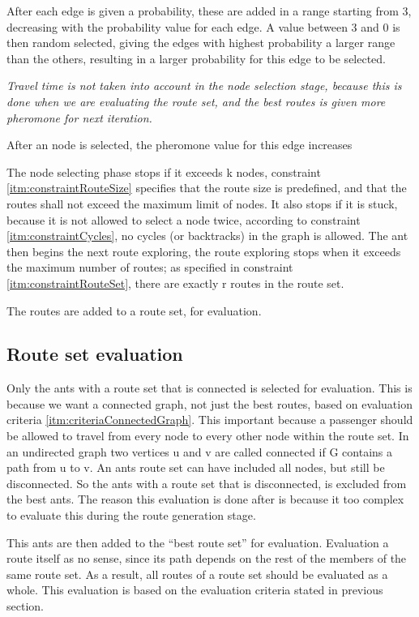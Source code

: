 After each edge is given a probability, these are added in a range starting from 3, decreasing with the probability value for each edge. A value between 3 and 0 is then random selected, giving the edges with highest probability a larger range than the others, resulting in a larger probability for this edge to be selected. 

\textit{Travel time is not taken into account in the node selection stage, because this is done when we are evaluating the route set, and the best routes is given more pheromone for next iteration.} %

After an node is selected, the pheromone value for this edge increases 

The node selecting phase stops if it exceeds k nodes, constraint \ref{itm:constraintRouteSize} specifies that the route size is predefined, and that the routes shall not exceed the maximum limit of nodes. It also stops if it is stuck, because it is not allowed to select a node twice, according to constraint \ref{itm:constraintCycles}, no cycles (or backtracks) in the graph is allowed. The ant then begins the next route exploring, the route exploring stops when it exceeds the maximum number of routes; as specified in constraint \ref{itm:constraintRouteSet}, there are exactly r routes in the route set. 

The routes are added to a route set, for evaluation.

\subsection{Route set evaluation}

Only the ants with a route set that is connected is selected for evaluation. This is because we want a connected graph, not just the best routes, based on evaluation criteria \ref{itm:criteriaConnectedGraph}. This important because a passenger should be allowed to travel from every node to every other node within the route set. In an undirected graph two vertices u and v are called connected if G contains a path from u to v. An ants route set can have included all nodes, but still be disconnected. So the ants with a route set that is disconnected, is excluded from the best ants. The reason this evaluation is done after is because it too complex to evaluate this during the route generation stage. 

This ants are then added to the ``best route set'' for evaluation. Evaluation a route itself as no sense, since its path depends on the rest of the members of the same route set. As a result, all routes of a route set should be evaluated as a whole. This evaluation is based on the evaluation criteria stated in previous section.

